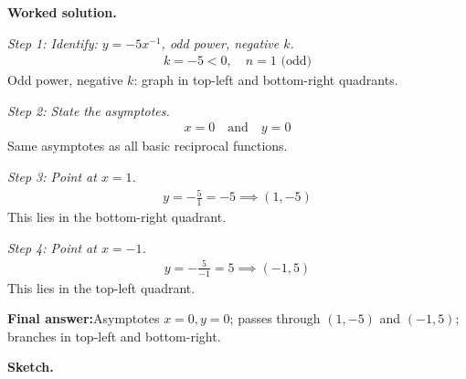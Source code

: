 \documentclass[11pt]{article}
\begin{document}
\textbf{Worked solution.}

\textit{Step 1: Identify: \( y = -5x^{-1} \), odd power, negative \( k \).}
\[\begin{gathered}
k = -5 < 0, \quad n = 1 \text{ (odd)}
\end{gathered}\]
Odd power, negative \( k \): graph in top-left and bottom-right quadrants.

\textit{Step 2: State the asymptotes.}
\[\begin{gathered}
x = 0 \quad \text{and} \quad y = 0
\end{gathered}\]
Same asymptotes as all basic reciprocal functions.

\textit{Step 3: Point at \( x = 1 \).}
\[\begin{gathered}
y = -\frac{5}{1} = -5 \implies (1, -5)
\end{gathered}\]
This lies in the bottom-right quadrant.

\textit{Step 4: Point at \( x = -1 \).}
\[\begin{gathered}
y = -\frac{5}{-1} = 5 \implies (-1, 5)
\end{gathered}\]
This lies in the top-left quadrant.

\begin{answerbox}
\textbf{Final answer:}\quad Asymptotes \(\displaystyle x = 0, y = 0\); passes through \(\displaystyle (1, -5)\) and \(\displaystyle (-1, 5)\); branches in top-left and bottom-right.
\end{answerbox}
\textbf{Sketch.}
\end{document}
